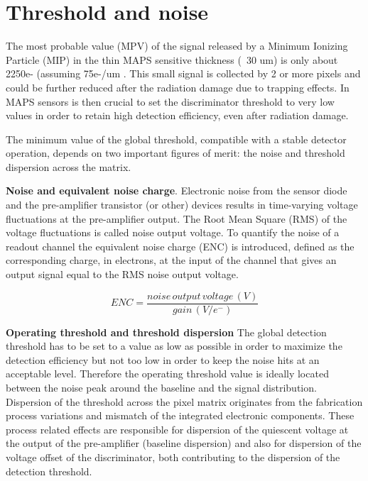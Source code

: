 
\section{Threshold and noise} \label{thresh_noise}




The most probable value (MPV) of the signal released by a Minimum Ionizing Particle (MIP) in the thin MAPS sensitive thickness (~30 um) is only about 2250e- (assuming 75e-/um \cite{wermes_book2020}. This small signal is collected by 2 or more pixels and could be further reduced after the radiation damage due to trapping effects. 
In MAPS sensors is then crucial to set the discriminator threshold to very low values in order to retain high detection efficiency, even after radiation damage.

The minimum value of the global threshold, compatible with a stable detector operation, depends on two important figures of merit: the noise and threshold dispersion across the matrix. 

\textbf{Noise and equivalent noise charge}. Electronic noise from the sensor diode and the pre-amplifier transistor (or other) devices results in time-varying voltage fluctuations at the pre-amplifier output. The Root Mean Square (RMS) of the voltage fluctuations is called noise output voltage.  
To quantify the noise of a readout channel the equivalent noise charge (ENC) is introduced, defined as the corresponding charge, in electrons, at the input of the channel that gives an output signal equal to the RMS noise output voltage.

\begin{equation}
ENC = \frac{noise \, output \, voltage \, (V)}{gain \, (V/e^{-})} 
\end{equation}

\textbf{Operating threshold and threshold dispersion} 
The global detection threshold has to be set to a value as low as possible in order to maximize the detection efficiency but not too low in order to keep the noise hits at an acceptable level.  Therefore the operating threshold value is ideally located between the noise peak around the baseline and the signal distribution. 
Dispersion of the threshold across the pixel matrix originates from the fabrication process variations and mismatch of the integrated electronic components. These process related effects are responsible for dispersion of the quiescent voltage at the output of the pre-amplifier (baseline dispersion) and also for dispersion of the voltage offset of the discriminator, both contributing to the dispersion of the detection threshold. 

